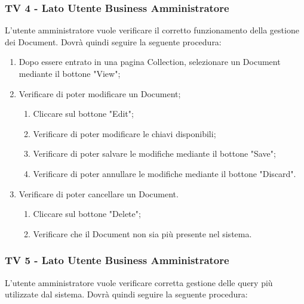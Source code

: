 \subsubsection{TV 4 - Lato Utente Business Amministratore}

L’utente amministratore vuole verificare il corretto funzionamento della gestione dei Document.
Dovrà quindi seguire la seguente procedura:


\begin{enumerate}
\item Dopo essere entrato in una pagina Collection, selezionare un Document mediante il bottone "View";
\item Verificare di poter modificare un Document;
\begin{enumerate}
\item Cliccare sul bottone "Edit";
\item Verificare di poter modificare le chiavi disponibili;
\item Verificare di poter salvare le modifiche mediante il bottone "Save";
\item Verificare di poter annullare le modifiche mediante il bottone "Discard".
\end{enumerate}
\item Verificare di poter cancellare un Document.
\begin{enumerate}
\item Cliccare sul bottone "Delete";
\item Verificare che il Document non sia più presente nel sistema.
\end{enumerate}
\end{enumerate}


\subsubsection{TV 5 - Lato Utente Business Amministratore}
L’utente amministratore vuole verificare corretta gestione delle query più utilizzate dal sistema.
Dovrà quindi seguire la seguente procedura:

